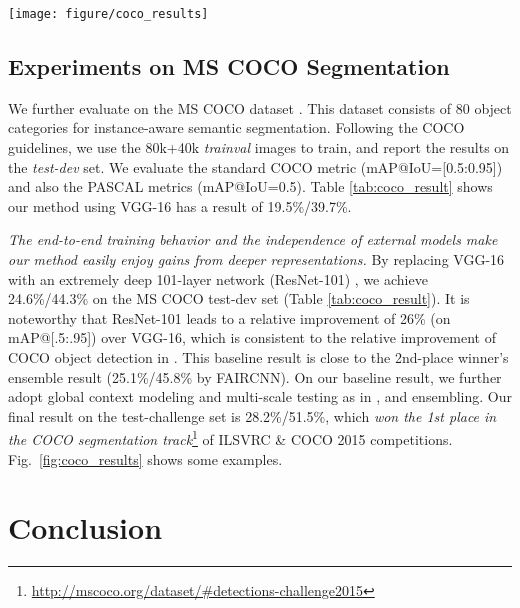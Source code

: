 \documentclass[10pt,twocolumn,letterpaper]{article}
\begin{document}
\begin{figure*}[t]
\begin{center}
\texttt{[image: figure/coco\_results]}
\end{center}
\vspace{-1em}
\caption{Our instance-aware semantic segmentation results on the MS COCO test-dev set using ResNet-101 \cite{He2015a}.}
\label{fig:coco_results}
\vspace{-1em}
\end{figure*}

\subsection{Experiments on MS COCO Segmentation}

We further evaluate on the MS COCO dataset \cite{Lin2014}.
This dataset consists of 80 object categories for instance-aware semantic segmentation. Following the COCO guidelines, we use the 80k+40k \emph{trainval} images to train, and report the results on the \emph{test-dev} set. We evaluate the standard COCO metric (mAP@IoU=[0.5:0.95]) and also the PASCAL metrics (mAP@IoU=0.5). Table \ref{tab:coco_result} shows our method using VGG-16 has a result of 19.5\%/39.7\%.

\emph{The end-to-end training behavior and the independence of external models make our method easily enjoy gains from deeper representations.}
By replacing VGG-16 with an extremely deep 101-layer network (ResNet-101) \cite{He2015a}, we achieve 24.6\%/44.3\% on the MS COCO test-dev set (Table \ref{tab:coco_result}).
It is noteworthy that ResNet-101 leads to a relative improvement of 26\% (on mAP@[.5:.95]) over VGG-16, which is consistent to the relative improvement of COCO object detection in \cite{He2015a}.
This baseline result is close to the 2nd-place winner's ensemble result (25.1\%/45.8\% by FAIRCNN).
On our baseline result, we further adopt global context modeling and multi-scale testing as in \cite{He2015a}, and ensembling. Our final result on the test-challenge set is 28.2\%/51.5\%, which \emph{won the 1st place in the COCO segmentation track}\footnote{\fontsize{7pt}{1em}\selectfont\url{http://mscoco.org/dataset/\#detections-challenge2015}} of ILSVRC \& COCO 2015 competitions. Fig.~\ref{fig:coco_results} shows some examples.



\section{Conclusion}
\end{document}
